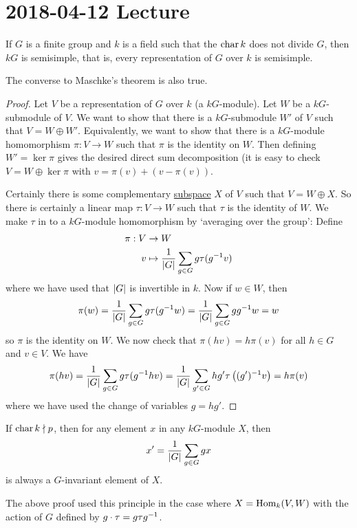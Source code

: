 \section{2018-04-12 Lecture}

\begin{thm}
	If $G$ is a finite group and $k$ is a field such that the $\operatorname{char} k$ does not divide $G$, then $kG$ is semisimple, that is, every representation of $G$ over $k$ is semisimple.
\end{thm}

\begin{rmk}
	The converse to Maschke's theorem is also true.
\end{rmk}

\begin{proof}
	Let $V$ be a representation of $G$ over $k$ (a $kG$-module).
	Let $W$ be a $kG$-submodule of $V$.
	We want to show that there is a $kG$-submodule $W'$ of $V$ such that $V=W\oplus W'$.
	Equivalently, we want to show that there is a $kG$-module homomorphism $\pi: V \to W$ such that $\pi$ is the identity on $W$.
	Then defining $W'=\ker\pi$ gives the desired direct sum decomposition (it is easy to check $V=W\oplus\ker\pi$ with $v=\pi(v)+(v-\pi(v))$.
	
	Certainly there is some complementary \underline{subspace} $X$ of $V$ such that $V=W\oplus X$.
	So there is certainly a linear map $\tau:V \to W$ such that $\tau$ is the identity of $W$.
	We make $\tau$ in to a $kG$-module homomorphism by `averaging over the group':
	Define
	\begin{align*}
		\pi: V &\to W \\
		v &\mapsto \frac 1{\left\lvert G \right\rvert} \sum_{g \in G} g \tau(g^{-1} v)
	\end{align*}
	where we have used that $\left\lvert G \right\rvert$ is invertible in $k$.	
	Now if $w \in W$, then
	\[\pi(w) = \frac 1{\left\lvert G \right\rvert} \sum_{g \in G} g\tau(g^{-1} w) = \frac 1{\left\lvert G \right\rvert} \sum_{g \in G} gg^{-1} w = w \]
	so $\pi$ is the identity on $W$.
	We now check that $\pi(hv)=h\pi(v)$ for all $h \in G$ and $v \in V$.
	We have
	\[\pi(hv) = \frac 1{\left\lvert G \right\rvert} \sum_{g \in G} g\tau(g^{-1} hv) = \frac 1{\left\lvert G \right\rvert} \sum_{g' \in G} hg'\tau\left((g')^{-1} v\right) = h\pi(v)\]
	where we have used the change of variables $g=hg'$.
\end{proof}

\begin{rmk}
	If $\operatorname{char} k \nmid p$, then for any element $x$ in any $kG$-module $X$, then
	\[x' = \frac 1{\left\lvert G \right\rvert} \sum_{g \in G} gx\]
	is always a $G$-invariant element of $X$.
	
	The above proof used this principle in the case where $X=\operatorname{Hom}_k(V,W)$ with the action of $G$ defined by $g \cdot\tau = g\tau g^{-1}$.
\end{rmk}

